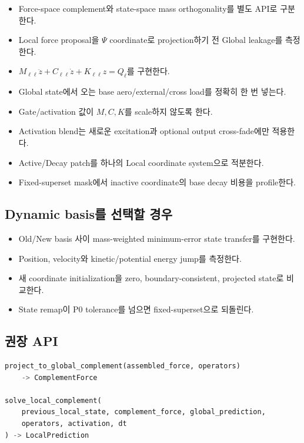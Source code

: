 \documentclass[10pt,a4paper]{article}
\newcommand{\todo}{\textcolor{TodoGray}{\(\square\)}}
\begin{document}
\begin{itemize}
  \item[\todo] Force-space complement와 state-space mass orthogonality를 별도 API로 구분한다.
  \item[\todo] Local force proposal을 \(\Psi\) coordinate로 projection하기 전 Global leakage를 측정한다.
  \item[\todo] \(M_{\ell\ell}\ddot z+C_{\ell\ell}\dot z+K_{\ell\ell}z=Q_\ell\)를 구현한다.
  \item[\todo] Global state에서 오는 base aero/external/cross load를 정확히 한 번 넣는다.
  \item[\todo] Gate/activation 값이 \(M,C,K\)를 scale하지 않도록 한다.
  \item[\todo] Activation blend는 새로운 excitation과 optional output cross-fade에만 적용한다.
  \item[\todo] Active/Decay patch를 하나의 Local coordinate system으로 적분한다.
  \item[\todo] Fixed-superset mask에서 inactive coordinate의 base decay 비용을 profile한다.
\end{itemize}

\subsection*{Dynamic basis를 선택할 경우}

\begin{itemize}
  \item[\todo] Old/New basis 사이 mass-weighted minimum-error state transfer를 구현한다.
  \item[\todo] Position, velocity와 kinetic/potential energy jump를 측정한다.
  \item[\todo] 새 coordinate initialization을 zero, boundary-consistent, projected state로 비교한다.
  \item[\todo] State remap이 P0 tolerance를 넘으면 fixed-superset으로 되돌린다.
\end{itemize}

\subsection*{권장 API}

\begin{lstlisting}[language=Python]
project_to_global_complement(assembled_force, operators)
    -> ComplementForce

solve_local_complement(
    previous_local_state, complement_force, global_prediction,
    operators, activation, dt
) -> LocalPrediction
\end{lstlisting}
\end{document}
